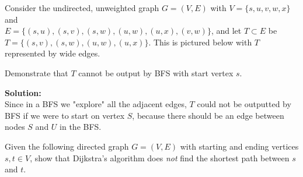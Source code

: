 \documentclass[9pt]{article}
\begin{document}
Consider the undirected, unweighted graph $G=(V,E)$ with $V=\{s,u,v,w,x\}$ and
\\$E=\{(s, u), (s, v), (s, w), (u, w), (u, x), (v, w)\}$, and let $T\subset E$ be $T=\{(s, v), (s, w), (u, w), (u, x)\}$. This is pictured below with $T$ represented by wide edges.
\begin{center}
\end{center}
Demonstrate that $T$ cannot be output by BFS with start vertex $s$.


\if
\vspace{2mm}

\textbf{Solution:} \\
Since in a BFS we "explore" all the adjacent edges, $T$ could not be outputted by BFS if we were to start on vertex $S$, because there should be an edge between nodes $S$ and $U$ in the BFS.



\fi
\newpage



\vspace{5mm}

\item

    Given the following directed graph $G = (V, E)$ with starting and ending vertices $s, t \in V$, show that Dijkstra's algorithm does \textit{not} find the shortest path between $s$ and $t$.
\end{document}
